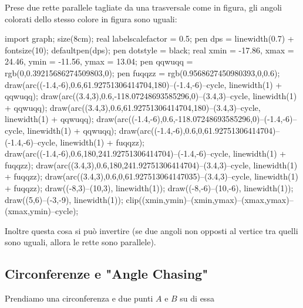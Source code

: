 \documentclass[11pt]{scrartcl}
\begin{document}
	\begin{fact}
		Prese due rette parallele tagliate da una trasversale come in figura, gli angoli colorati dello stesso colore in figura sono uguali:
		\begin{center}
			\begin{asy}
				import graph; size(8cm); 
				real labelscalefactor = 0.5; 
				pen dps = linewidth(0.7) + fontsize(10); defaultpen(dps); 
				pen dotstyle = black; 
				real xmin = -17.86, xmax = 24.46, ymin = -11.56, ymax = 13.04;  
				pen qqwuqq = rgb(0,0.39215686274509803,0); pen fuqqzz = rgb(0.9568627450980393,0,0.6); 
				draw(arc((-1.4,-6),0.6,61.92751306414704,180)--(-1.4,-6)--cycle, linewidth(1) + qqwuqq); 
				draw(arc((3.4,3),0.6,-118.07248693585296,0)--(3.4,3)--cycle, linewidth(1) + qqwuqq); 
				draw(arc((3.4,3),0.6,61.92751306414704,180)--(3.4,3)--cycle, linewidth(1) + qqwuqq); 
				draw(arc((-1.4,-6),0.6,-118.07248693585296,0)--(-1.4,-6)--cycle, linewidth(1) + qqwuqq); 
				draw(arc((-1.4,-6),0.6,0,61.92751306414704)--(-1.4,-6)--cycle, linewidth(1) + fuqqzz); 
				draw(arc((-1.4,-6),0.6,180,241.92751306414704)--(-1.4,-6)--cycle, linewidth(1) + fuqqzz); 
				draw(arc((3.4,3),0.6,180,241.92751306414704)--(3.4,3)--cycle, linewidth(1) + fuqqzz); 
				draw(arc((3.4,3),0.6,0,61.927513064147035)--(3.4,3)--cycle, linewidth(1) + fuqqzz); 
				draw((-8,3)--(10,3), linewidth(1)); 
				draw((-8,-6)--(10,-6), linewidth(1)); 
				draw((5,6)--(-3,-9), linewidth(1));
				clip((xmin,ymin)--(xmin,ymax)--(xmax,ymax)--(xmax,ymin)--cycle);
			\end{asy}
		\end{center}
		Inoltre questa cosa si può invertire (se due angoli non opposti al vertice tra quelli sono uguali, allora le rette sono parallele).
	\end{fact}
	\subsection{Circonferenze e "Angle Chasing"}
	Prendiamo una circonferenza e due punti $A$ e $B$ su di essa
	
\end{document}
